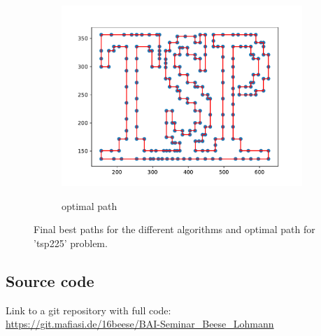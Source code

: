 \documentclass[12pt]{article}
\theoremstyle{plain}
\theoremstyle{definition}
\theoremstyle{remark}
\begin{document}
\begin{figure}[ht]
\begin{subfigure}{.5\textwidth}
		\includegraphics[scale = 0.44]{../../Implementation/gen/optimal_path_tsp225}
		\label{fig:optimal_path_tsp225}
		\caption{optimal path}
	\end{subfigure}
	\caption{Final best paths for the different algorithms and optimal path for 'tsp225' problem.}
	\label{fig:final_paths_tsp225}
\end{figure}

\newpage

\subsection{Source code}

Link to a git repository with full code:\\
\url{https://git.mafiasi.de/16beese/BAI-Seminar_Beese_Lohmann}
\end{document}
